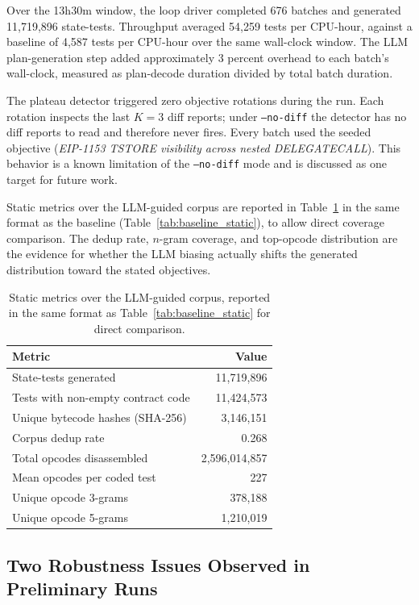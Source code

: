 \documentclass[conference]{IEEEtran}
\begin{document}
Over the 13h30m window, the loop driver completed 676 batches and generated 11{,}719{,}896 state-tests. Throughput averaged 54{,}259 tests per CPU-hour, against a baseline of 4{,}587 tests per CPU-hour over the same wall-clock window. The LLM plan-generation step added approximately 3 percent overhead to each batch's wall-clock, measured as plan-decode duration divided by total batch duration.

The plateau detector triggered zero objective rotations during the run. Each rotation inspects the last $K=3$ diff reports; under \texttt{--no-diff} the detector has no diff reports to read and therefore never fires. Every batch used the seeded objective (\textit{EIP-1153 TSTORE visibility across nested DELEGATECALL}). This behavior is a known limitation of the \texttt{--no-diff} mode and is discussed as one target for future work.

Static metrics over the LLM-guided corpus are reported in Table~\ref{tab:llm_static} in the same format as the baseline (Table~\ref{tab:baseline_static}), to allow direct coverage comparison. The dedup rate, $n$-gram coverage, and top-opcode distribution are the evidence for whether the LLM biasing actually shifts the generated distribution toward the stated objectives.

\begin{table}[t]
\centering
\caption{Static metrics over the LLM-guided corpus, reported in the same format as Table~\ref{tab:baseline_static} for direct comparison.}
\label{tab:llm_static}
\begin{tabular}{lr}
\hline
\textbf{Metric} & \textbf{Value} \\
\hline
State-tests generated & 11{,}719{,}896 \\
Tests with non-empty contract code & 11{,}424{,}573 \\
Unique bytecode hashes (SHA-256) & 3{,}146{,}151 \\
Corpus dedup rate & 0.268 \\
Total opcodes disassembled & 2{,}596{,}014{,}857 \\
Mean opcodes per coded test & 227 \\
Unique opcode 3-grams & 378{,}188 \\
Unique opcode 5-grams & 1{,}210{,}019 \\
\hline
\end{tabular}
\end{table}

\subsection{Two Robustness Issues Observed in Preliminary Runs}
\end{document}

